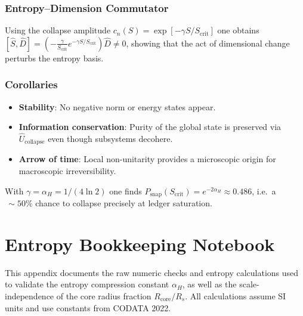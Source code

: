 \documentclass[a4paper, 12pt, oneside]{book}
\numberwithin{equation}{chapter}
\begin{document}
\subsection{Entropy–Dimension Commutator}
Using the collapse amplitude
\( c_n(S)=\exp[-\gamma S/S_{\mathrm{crit}}]\)
one obtains
\( [\hat S,\hat D]\!=\!\left(-\frac{\gamma}{S_{\text{crit}}}e^{-\gamma S/S_{\text{crit}}}\right)\hat D\neq0\),
showing that the act of dimensional change perturbs the entropy basis.

\subsection{Corollaries}
\begin{itemize}
  \item \textbf{Stability}: No negative norm or energy states appear.
  \item \textbf{Information conservation}: Purity of the global state is
        preserved via $\hat U_{\mathrm{collapse}}$ even though subsystems decohere.
  \item \textbf{Arrow of time}: Local non-unitarity provides a
        microscopic origin for macroscopic irreversibility.
\end{itemize}

\begin{tcolorbox}[colback=gray!5,colframe=gray!50!black,title=Numerical check]
With \(\gamma=\alpha_H=1/(4\ln2)\) one finds
\(P_{\mathrm{snap}}(S_{\mathrm{crit}})=e^{-2\alpha_H}\approx0.486\),
 i.e.\ a $\,\sim50\%$ chance to collapse precisely at ledger saturation.
\end{tcolorbox}



\chapter{Entropy Bookkeeping Notebook}
\label{app:EntropyNotebook}

\noindent
This appendix documents the raw numeric checks and entropy calculations used to validate  
the entropy compression constant \( \alpha_H \), as well as the scale-independence of the  
core radius fraction \( R_{\text{core}} / R_s \).  
All calculations assume SI units and use constants from CODATA 2022.
\end{document}
